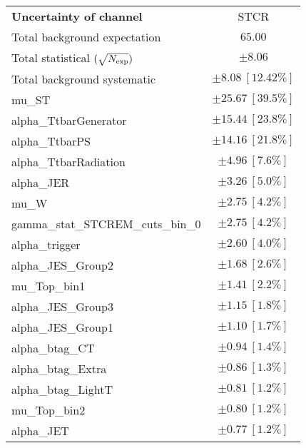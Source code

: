 
\begin{table}
\begin{center}
\setlength{\tabcolsep}{0.0pc}
\begin{tabular*}{\textwidth}{@{\extracolsep{\fill}}lc}
\noalign{\smallskip}\hline\noalign{\smallskip}
{\bf Uncertainty of channel}                                    & STCR          \\
\noalign{\smallskip}\hline\noalign{\smallskip}
Total background expectation             &  $65.00$       \\
\noalign{\smallskip}\hline\noalign{\smallskip}
Total statistical $(\sqrt{N_{\rm exp}})$              & $\pm 8.06$       \\
Total background systematic               & $\pm 8.08\ [12.42\%] $             \\
\noalign{\smallskip}\hline\noalign{\smallskip}
\noalign{\smallskip}\hline\noalign{\smallskip}
mu\_ST         & $\pm 25.67\ [39.5\%] $       \\
alpha\_TtbarGenerator         & $\pm 15.44\ [23.8\%] $       \\
alpha\_TtbarPS         & $\pm 14.16\ [21.8\%] $       \\
alpha\_TtbarRadiation         & $\pm 4.96\ [7.6\%] $       \\
alpha\_JER         & $\pm 3.26\ [5.0\%] $       \\
mu\_W         & $\pm 2.75\ [4.2\%] $       \\
gamma\_stat\_STCREM\_cuts\_bin\_0         & $\pm 2.75\ [4.2\%] $       \\
alpha\_trigger         & $\pm 2.60\ [4.0\%] $       \\
alpha\_JES\_Group2         & $\pm 1.68\ [2.6\%] $       \\
mu\_Top\_bin1         & $\pm 1.41\ [2.2\%] $       \\
alpha\_JES\_Group3         & $\pm 1.15\ [1.8\%] $       \\
alpha\_JES\_Group1         & $\pm 1.10\ [1.7\%] $       \\
alpha\_btag\_CT         & $\pm 0.94\ [1.4\%] $       \\
alpha\_btag\_Extra         & $\pm 0.86\ [1.3\%] $       \\
alpha\_btag\_LightT         & $\pm 0.81\ [1.2\%] $       \\
mu\_Top\_bin2         & $\pm 0.80\ [1.2\%] $       \\
alpha\_JET         & $\pm 0.77\ [1.2\%] $       \\

\end{tabular*}
\end{center}
\end{table}
